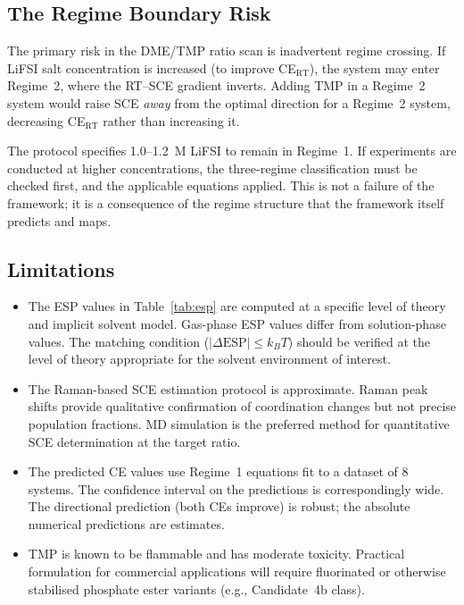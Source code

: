 \documentclass[11pt]{article}
\theoremstyle{plain}
\theoremstyle{definition}
\theoremstyle{remark}
\begin{document}
\subsection{The Regime Boundary Risk}

The primary risk in the DME/TMP ratio scan is inadvertent regime crossing.
If LiFSI salt concentration is increased (to improve CE$_{\mathrm{RT}}$),
the system may enter Regime~2, where the RT--SCE gradient inverts.
Adding TMP in a Regime~2 system would raise SCE \emph{away} from the
optimal direction for a Regime~2 system, decreasing CE$_{\mathrm{RT}}$
rather than increasing it.

The protocol specifies 1.0--1.2~M LiFSI to remain in Regime~1.  If
experiments are conducted at higher concentrations, the three-regime
classification must be checked first, and the applicable equations
applied.  This is not a failure of the framework; it is a consequence of
the regime structure that the framework itself predicts and maps.

\subsection{Limitations}

\begin{itemize}[leftmargin=2em]
  \item The ESP values in Table~\ref{tab:esp} are computed at a specific
        level of theory and implicit solvent model.  Gas-phase ESP
        values differ from solution-phase values.  The matching condition
        ($|\Delta\mathrm{ESP}| \leq k_BT$) should be verified at the
        level of theory appropriate for the solvent environment of interest.
  \item The Raman-based SCE estimation protocol is approximate.  Raman
        peak shifts provide qualitative confirmation of coordination
        changes but not precise population fractions.  MD simulation
        is the preferred method for quantitative SCE determination at
        the target ratio.
  \item The predicted CE values use Regime~1 equations fit to a dataset
        of 8 systems.  The confidence interval on the predictions is
        correspondingly wide.  The directional prediction (both CEs
        improve) is robust; the absolute numerical predictions are
        estimates.
  \item TMP is known to be flammable and has moderate toxicity.
        Practical formulation for commercial applications will require
        fluorinated or otherwise stabilised phosphate ester variants
        (e.g., Candidate~4b class).
\end{itemize}
\end{document}
